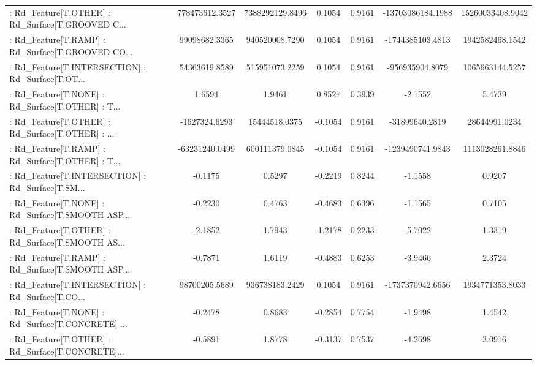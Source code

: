 \begin{longtable}{p{4cm}cccccc}
 : Rd\_Feature[T.OTHER] : Rd\_Surface[T.GROOVED C... &    778473612.3527 &   7388292129.8496 &  0.1054 &       0.9161 &  -13703086184.1988 &  15260033408.9042 \\
 : Rd\_Feature[T.RAMP] : Rd\_Surface[T.GROOVED CO... &     99098682.3365 &    940520008.7290 &  0.1054 &       0.9161 &   -1744385103.4813 &   1942582468.1542 \\
 : Rd\_Feature[T.INTERSECTION] : Rd\_Surface[T.OT... &     54363619.8589 &    515951073.2259 &  0.1054 &       0.9161 &    -956935904.8079 &   1065663144.5257 \\
 : Rd\_Feature[T.NONE] : Rd\_Surface[T.OTHER] : T... &            1.6594 &            1.9461 &  0.8527 &       0.3939 &            -2.1552 &            5.4739 \\
 : Rd\_Feature[T.OTHER] : Rd\_Surface[T.OTHER] : ... &     -1627324.6293 &     15444518.0375 & -0.1054 &       0.9161 &     -31899640.2819 &     28644991.0234 \\
 : Rd\_Feature[T.RAMP] : Rd\_Surface[T.OTHER] : T... &    -63231240.0499 &    600111379.0845 & -0.1054 &       0.9161 &   -1239490741.9843 &   1113028261.8846 \\
 : Rd\_Feature[T.INTERSECTION] : Rd\_Surface[T.SM... &           -0.1175 &            0.5297 & -0.2219 &       0.8244 &            -1.1558 &            0.9207 \\
 : Rd\_Feature[T.NONE] : Rd\_Surface[T.SMOOTH ASP... &           -0.2230 &            0.4763 & -0.4683 &       0.6396 &            -1.1565 &            0.7105 \\
 : Rd\_Feature[T.OTHER] : Rd\_Surface[T.SMOOTH AS... &           -2.1852 &            1.7943 & -1.2178 &       0.2233 &            -5.7022 &            1.3319 \\
 : Rd\_Feature[T.RAMP] : Rd\_Surface[T.SMOOTH ASP... &           -0.7871 &            1.6119 & -0.4883 &       0.6253 &            -3.9466 &            2.3724 \\
 : Rd\_Feature[T.INTERSECTION] : Rd\_Surface[T.CO... &     98700205.5689 &    936738183.2429 &  0.1054 &       0.9161 &   -1737370942.6656 &   1934771353.8033 \\
 : Rd\_Feature[T.NONE] : Rd\_Surface[T.CONCRETE] ... &           -0.2478 &            0.8683 & -0.2854 &       0.7754 &            -1.9498 &            1.4542 \\
 : Rd\_Feature[T.OTHER] : Rd\_Surface[T.CONCRETE]... &           -0.5891 &            1.8778 & -0.3137 &       0.7537 &            -4.2698 &            3.0916 \\

\end{longtable}
